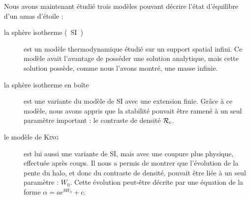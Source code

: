 Nous avons maintenant étudié trois modèles pouvant décrire l'état d'équilibre d'un amas d'étoile :
\begin{description}
	\item[la sphère isotherme (~SI~)] est un modèle thermodynamique étudié sur un support spatial infini. Ce modèle avait l'avantage de posséder une solution analytique,
		mais cette solution possède, comme nous l'avons montré, une masse infinie.
	\item[la sphère isotherme en boîte] est une variante du modèle de SI avec une extension finie. Grâce à ce modèle, nous avons appris que la stabilité pouvait être ramené à un seul paramètre important :
		le contraste de densité $\mathcal{R}_c$.
	\item[le modèle de \textsc{King}] est lui aussi une variante de SI, mais avec une coupure plus physique, effectuée après coups. Il nous a permis de montrer que l'évolution
		de la pente du halo, et donc du contraste de densité, pouvait être liée à un seul paramètre : $W_0$. Cette évolution peut-être décrite par une équation de la forme $\alpha = a e^{b W_0} + c$.
\end{description}
